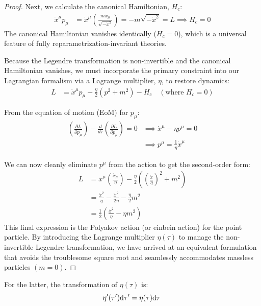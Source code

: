 \begin{tcolorbox}[breakable]
\begin{proof}
		Next, we calculate the canonical Hamiltonian, $H_c$:
		\begin{align*}
			\dot{x}^\mu p_\mu &= \dot{x}^\mu \left( \frac{m\dot{x}_\mu}{\sqrt{-\dot{x}^2}} \right) = -m\sqrt{-\dot{x}^2} = L \implies H_c = 0
		\end{align*}
		The canonical Hamiltonian vanishes identically ($H_c = 0$), which is a universal feature of fully reparametrization-invariant theories. 
		
		Because the Legendre transformation is non-invertible and the canonical Hamiltonian vanishes, we must incorporate the primary constraint into our Lagrangian formalism via a Lagrange multiplier, $\eta$, to restore dynamics:
		\begin{align*}
			L &= \dot{x}^\mu p_\mu - \frac{\eta}{2}(p^2 + m^2) - H_c \quad (\text{where } H_c=0)
		\end{align*}
		
		From the equation of motion (EoM) for $p_\mu$:
		\begin{align*}
			\left( \frac{\partial L}{\partial p_\mu} \right) - \frac{d}{d\tau}\left( \frac{\partial L}{\partial \dot{p}_\mu} \right) = 0 &\implies \dot{x}^\mu - \eta p^\mu = 0 \\
			&\implies p^\mu = \frac{1}{\eta}\dot{x}^\mu
		\end{align*}
		
		We can now cleanly eliminate $p^\mu$ from the action to get the second-order form:
		\begin{align*}
			L &= \dot{x}^\mu\left(\frac{\dot{x}_\mu}{\eta}\right) - \frac{\eta}{2}\left( \left(\frac{\dot{x}}{\eta}\right)^2 + m^2 \right) \\
			&= \frac{\dot{x}^2}{\eta} - \frac{\dot{x}^2}{2\eta} - \frac{\eta}{2}m^2 \\
			&= \frac{1}{2}\left(\frac{\dot{x}^2}{\eta} - \eta m^2\right)
		\end{align*}
		This final expression is the Polyakov action (or einbein action) for the point particle. By introducing the Lagrange multiplier $\eta(\tau)$ to manage the non-invertible Legendre transformation, we have arrived at an equivalent formulation that avoids the troublesome square root and seamlessly accommodates massless particles $(m=0)$.
	\end{proof}
\end{tcolorbox}
For the latter, the transformation of $\eta(\tau)$ is: 
\begin{equation}
	\eta^\prime(\tau^\prime)\mathrm{d}\tau^\prime=\eta(\tau)\mathrm{d}\tau\:
\end{equation}
